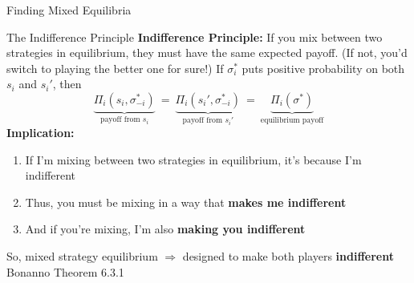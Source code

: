 
\begin{frame}[standout]
Finding Mixed Equilibria
\end{frame}

\begin{frame}{The Indifference Principle}
\textbf{Indifference Principle:} If you mix between two strategies in equilibrium, they must have the same expected payoff. (If not, you'd switch to playing the better one for sure!)
\bsk
If $\sigma_i^*$ puts positive probability on both $s_i$ and $s_i'$, then
$$\underbrace{\Pi_i(s_i,\sigma_{-i}^*)}_{\text{payoff from }s_i}\ =\ \underbrace{\Pi_i(s_i',\sigma_{-i}^*)}_{\text{payoff from }s_i'}\ =\ \underbrace{\Pi_i(\sigma^*)}_{\text{equilibrium payoff}}$$
\bsk
\textbf{Implication:}
\begin{enumerate}
    \item If I'm mixing between two strategies in equilibrium, it's because I'm indifferent
    \item Thus, you must be mixing in a way that \textbf{makes me indifferent}
    \item And if you're mixing, I'm also \textbf{making you indifferent}
\end{enumerate}
So, mixed strategy equilibrium $\Rightarrow$ designed to make both players \textbf{indifferent}
\vfill
{\footnotesize Bonanno Theorem 6.3.1}
\vspace{-0.2in}
\end{frame}

